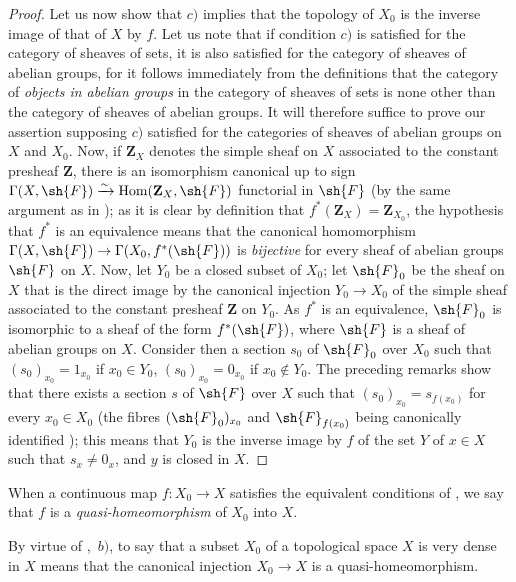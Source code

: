 \begin{proof}
Let us now show that $c)$ implies that the topology of $X_0$ is the inverse image of that of $X$ by $f$.
Let us note that if condition $c)$ is satisfied for the category of sheaves of sets, it is also satisfied for the category of sheaves of abelian groups, for it follows immediately from the definitions  that the category of \emph{objects in abelian groups} in the category of sheaves of sets is none other than the category of sheaves of abelian groups.
It will therefore suffice to prove our assertion supposing $c)$ satisfied for the categories of sheaves of abelian groups on $X$ and $X_0$.
Now, if $\mathbf{Z}_X$ denotes the simple sheaf on $X$ associated to the constant presheaf $\mathbf{Z}$, there is an isomorphism canonical up to sign $\Gamma(X,\sh{F})\xrightarrow{\sim}\operatorname{Hom}(\mathbf{Z}_X,\sh{F})$ functorial in $\sh{F}$ (by the same argument as in ); as it is clear by definition  that $f^*(\mathbf{Z}_X)=\mathbf{Z}_{X_0}$, the hypothesis that $f^*$ is an equivalence means that the canonical homomorphism $\Gamma(X,\sh{F})\to\Gamma(X_0,f^*(\sh{F}))$ is \emph{bijective} for every sheaf of abelian groups $\sh{F}$ on $X$.
Now, let $Y_0$ be a closed subset of $X_0$; let $\sh{F}_0$ be the sheaf on $X$ that is the direct image by the canonical injection $Y_0\to X_0$ of the simple sheaf associated to the constant presheaf $\mathbf{Z}$ on $Y_0$.
As $f^*$ is an equivalence, $\sh{F}_0$ is isomorphic to a sheaf of the form $f^*(\sh{F})$, where $\sh{F}$ is a sheaf of abelian groups on $X$.
Consider then a section $s_0$ of $\sh{F}_0$ over $X_0$ such that $(s_0)_{x_0}=1_{x_0}$ if $x_0\in Y_0$, $(s_0)_{x_0}=0_{x_0}$ if $x_0\notin Y_0$.
The preceding remarks show that there exists a section $s$ of $\sh{F}$ over $X$ such that $(s_0)_{x_0}=s_{f(x_0)}$ for every $x_0\in X_0$ (the fibres $(\sh{F}_0)_{x_0}$ and $\sh{F}_{f(x_0)}$ being canonically identified ); this means that $Y_0$ is the inverse image by $f$ of the set $Y$ of $x\in X$ such that $s_x\neq 0_x$, and $y$ is closed in $X$.
\end{proof}

\begin{definition}[10.2.2]
\label{IV.10.2.2}
When a continuous map $f:X_0\to X$ satisfies the equivalent conditions of , we say that $f$ is a \emph{quasi-homeomorphism} of $X_0$ into $X$.
\end{definition}

By virtue of ,~$b)$, to say that a subset $X_0$ of a topological space $X$ is very dense in $X$ means that the canonical injection $X_0\to X$ is a quasi-homeomorphism.

